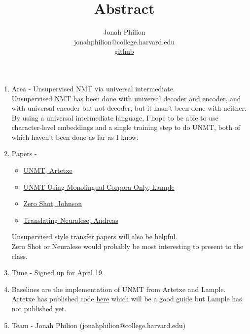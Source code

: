 \documentclass[11pt]{article}
\title{Abstract}
\author{Jonah Philion \\ jonahphilion@college.harvard.edu \\ \href{https://github.com/jonahthelion/cs287-s18/}{github}}
\begin{document}
\maketitle{}
\begin{enumerate}
\item Area - Unsupervised NMT via universal intermediate.\\ Unsupervised NMT has been done with universal decoder and encoder, and with universal encoder but not decoder, but it hasn't been done with neither. By using a universal intermediate language, I hope to be able to use character-level embeddings and a single training step to do UNMT, both of which haven't been done as far as I know.

\item Papers - \begin{itemize}\item \href{https://arxiv.org/pdf/1710.11041.pdf}{UNMT, Artetxe}
 \item\href{https://arxiv.org/pdf/1711.00043.pdf}{UNMT Using Monolingual Corpora Only, Lample}
\item\href{https://arxiv.org/pdf/1611.04558.pdf}{Zero Shot, Johnson}
\item\href{https://arxiv.org/pdf/1704.06960.pdf}{Translating Neuralese, Andreas}
\end{itemize}
Unsupervised style transfer papers will also be helpful.\\
Zero Shot or Neuralese would probably be most interesting to present to the class.

\item Time - Signed up for April 19.

\item Baselines are the implementation of UNMT from Artetxe and Lample. Artetxe has published code \href{https://github.com/artetxem/undreamt}{here} which will be a good guide but Lample has not published yet.

\item Team - Jonah Philion (jonahphilion@college.harvard.edu)
\end{enumerate}
\end{document}
